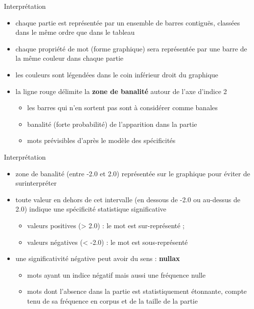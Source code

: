 \documentclass[xetex,xcolor={table,usenames,dvipsnames}]{beamer}
\newcommand{\bolder}[1]{{\color{purple}\bfseries#1}}
\begin{document}
\begin{frame}{Interprétation}
	\begin{itemize}
		\item chaque partie est représentée par un ensemble de barres contiguës, classées dans le
		même ordre que dans le tableau
		\item chaque propriété de mot (forme graphique) sera représentée
		par une barre de la même couleur dans chaque partie
		\item les couleurs sont légendées dans le coin inférieur droit du graphique
		\item la ligne rouge délimite la \bolder{zone de banalité} autour de l'axe d'indice \textsc{2} 
		\begin{itemize}
			\item les barres qui n'en sortent pas sont à considérer comme banales
			\item banalité (forte probabilité) de l'apparition dans la partie 
			\item mots prévisibles d'après le modèle des spécificités
		\end{itemize}
		\end{itemize}
\end{frame}
\begin{frame}{Interprétation}
\begin{itemize}
\item zone de banalité (entre \textsc{-2.0} et \textsc{2.0}) représentée sur le graphique pour éviter de surinterpréter
\item toute valeur en dehors de cet intervalle (en dessous de \textsc{-2.0} ou au-dessus de \textsc{2.0}) indique une spécificité statistique significative
\begin{itemize}
\item valeurs positives (\textsc{> 2.0}) : le mot est sur-représenté ;
\item valeurs négatives (\textsc{< -2.0}) : le mot est sous-représenté
\end{itemize}
\item une significativité négative peut avoir du sens : \bolder{nullax}
\begin{itemize}
	\item mots ayant un indice négatif mais aussi une fréquence nulle
	\item mots dont l’absence dans la partie est statistiquement
	étonnante, compte tenu de sa fréquence en corpus et de la taille de la partie 
\end{itemize}
\end{itemize}
\begin{flushright}
	{\small \citep{pincemin2022semantique}}
\end{flushright}
\end{frame}
\end{document}
